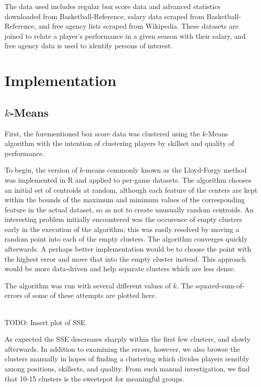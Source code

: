 \documentclass[letterpaper]{article}
\begin{document}
The data used includes regular box score data and advanced statistics downloaded from Basketball-Reference, salary data scraped from Basketball-Reference, and free agency lists scraped from Wikipedia. These datasets are joined to relate a player's performance in a given season with their salary, and free agency data is used to identify persons of interest.

\section{Implementation}

\subsection{$k$-Means}

First, the forementioned box score data was clustered using the $k$-Means algorithm with the intention of clustering players by skillset and quality of performance.

To begin, the version of $k$-means commonly known as the Lloyd-Forgy method was implemented in R and applied to per-game datasets. The algorithm chooses an initial set of centroids at random, although each feature of the centers are kept within the bounds of the maximum and minimum values of the corresponding feature in the actual dataset, so as not to create unusually random centroids. An interesting problem initially encountered was the occurence of empty clusters early in the execution of the algorithm; this was easily resolved by moving a random point into each of the empty clusters. The algorithm converges quickly afterwards. A perhaps better implementation would be to choose the point with the highest error and move that into the empty cluster instead. This approach would be more data-driven and help separate clusters which are less dense.

The algorithm was run with several different values of $k$. The squared-sum-of-errors of some of these attempts are plotted here.

\\TODO: Insert plot of SSE

As expected the SSE descreases sharply within the first few clusters, and slowly afterwards. In addition to examining the errors, however, we also browse the clusters manually in hopes of finding a clustering which divides players sensibly among positions, skillsets, and quality. From such manual investigation, we find that 10-15 clusters is the sweetspot for meaningful groups.
\end{document}
